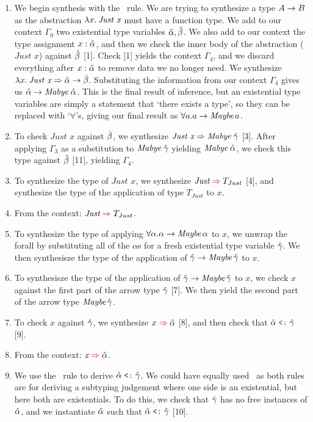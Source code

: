 \begin{enumerate}
    \item We begin synthesis with the \ArrIntroSyn\ rule. We are trying to synthesize a type $A \rightarrow B$  as the abstraction $\lambda x.\, \textit{Just x}$ must have a function type. We add to our context $\Gamma_0$ two existential type variables $\hat{\alpha}, \hat{\beta}$. We also add to our context the type assignment $x: \hat{\alpha}$, and then we check the inner body of the abstraction ($\textit{Just x}$) against $\hat{\beta}$ [1]. Check [1] yields the context $\Gamma_4$, and we discard everything after $x: \hat{\alpha}$ to remove data we no longer need. We synthesize $\lam{x} \textit{Just x} \syn \ahat \arr \bhat$. Substituting the information from our context $\Gamma_4$ gives us $\hat{\alpha} \rightarrow \textit{Mabye}\;\hat{\alpha}$. This is the final result of inference, but an existential type variables are simply a statement that `there exists a type', so they can be replaced with `$\forall$'s, giving our final result as $\forall a. a \rightarrow \textit{Maybe}\,a$.
    \item To check $\textit{Just x}$ against $\hat{\beta}$, we synthesize $\textit{Just x} \syn \textit{Mabye}\;\chat$ [3]. After applying $\Gamma_3$ as a substitution to $\textit{Mabye}\;\hat{\gamma}$ yielding $\textit{Mabye}\;\hat{\alpha}$, we check this type against $\hat{\beta}$ [11], yielding $\Gamma_4$. 
    \item To synthesize the type of $\textit{Just x}$, we synthesize $\textit{Just} \syn T_{Just}$ [4], and synthesize the type of the application of type $T_{Just}$ to $\textit{x}$.
    \item From the context: $\textit{Just} \syn T_{Just}$.
    \item To synthesize the type of applying $\forall \alpha. \alpha \rightarrow \textit{Maybe}\,\alpha$ to $\textit{x}$, we unwrap the forall by substituting all of the $\alpha$s for a fresh existential type variable $\hat{\gamma}$. We then synthesisze the type of the application of $\hat{\gamma} \rightarrow \textit{Maybe}\,\hat{\gamma}$ to $x$.
    \item To synthesisze the type of the application of $\hat{\gamma} \rightarrow \textit{Maybe}\,\hat{\gamma}$ to $x$, we check $x$ against the first part of the arrow type $\hat{\gamma}$ [7]. We then yield the second part of the arrow type $\textit{Maybe}\,\hat{\gamma}$. 
    \item To check $x$ against $\hat{\gamma}$, we synthesize $x \syn \ahat$ [8], and then check that $\ahat \subtype \chat$ [9].
    \item From the context: $\textit{x} \syn \ahat$.
    \item We use the \SubInstL\ rule to derive $\ahat \subtype \chat$. We could have equally used \SubInstR\ as both rules are for deriving a subtyping judgement where one side is an existential, but here both are existentials. To do this, we check that $\hat{\gamma}$ has no free instances of $\hat{\alpha}$, and we instantiate $\hat{\alpha}$ such that $\ahat \subtype \chat$ [10].

\end{enumerate}

